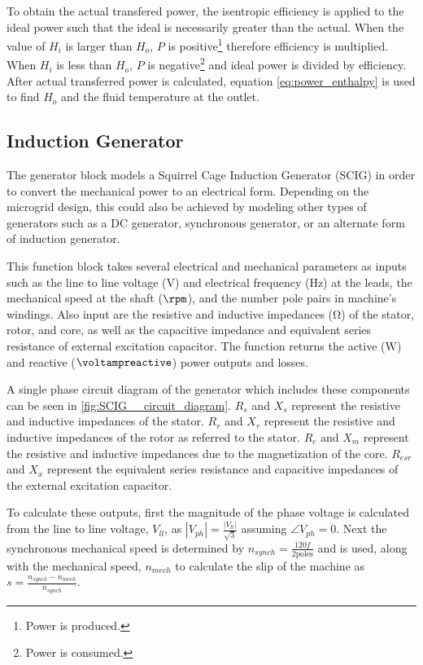 To obtain the actual transfered power, the isentropic efficiency is applied to the ideal power such that the ideal is necessarily greater than the actual. When the value of $H_i$ is larger than $H_o$, $P$ is positive\footnote{Power is produced.} therefore efficiency is multiplied. When $H_i$ is less than $H_o$, $P$ is negative\footnote{Power is consumed.} and ideal power is divided by efficiency. After actual transferred power is calculated, equation \ref{eq:power_enthalpy} is used to find $H_o$ and the fluid temperature at the outlet.

\subsection{Induction Generator}
The generator block models a Squirrel Cage Induction Generator (SCIG) in order to convert the mechanical power to an electrical form. Depending on the microgrid design, this could also be achieved by modeling other types of generators such as a DC generator, synchronous generator, or an alternate form of induction generator. 

This function block takes several electrical and mechanical parameters as inputs such as the line to line voltage ($\si{\volt}$) and electrical frequency ($\si{\hertz}$) at the leads, the mechanical speed at the shaft ($\si{\rpm}$), and the number pole pairs in machine's windings. Also input are the resistive and inductive impedances ($\si{\ohm}$) of the stator, rotor, and core, as well as the capacitive impedance and equivalent series resistance of external excitation capacitor. The function returns the active ($\si{\watt}$) and reactive ($\si{\voltampreactive}$) power outputs and losses.


A single phase circuit diagram of the generator which includes these components can be seen in \autoref{fig:SCIG__circuit_diagram}. $R_s$ and $X_s$ represent the resistive and inductive impedances of the stator. $R_r$ and $X_r$ represent the resistive and inductive impedances of the rotor as referred to the stator. $R_c$ and $X_m$ represent the resistive and inductive impedances due to the magnetization of the core. $R_{esr}$ and $X_x$ represent the equivalent series resistance and capacitive impedances of the external excitation capacitor.

To calculate these outputs, first the magnitude of the phase voltage is calculated from the line to line voltage, $V_{ll}$, as $ \left|V_{ph}\right| = \frac{\left|V_{ll}\right|}{\sqrt{3}} $ assuming $ \angle V_{ph} = 0 $. Next the synchronous mechanical speed is determined by $ n_{synch} = \frac{120f}{2\text{poles}} $ and is used, along with the mechanical speed, $n_{mech}$ to calculate the slip of the machine as $ s = \frac{n_{synch} - n_{mech}}{n_{synch}} $.

